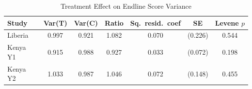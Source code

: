 \begin{table}[htbp]
\centering\small
\caption{Treatment Effect on Endline Score Variance}
\label{tab:variance}
\begin{tabular}{lcccccc}
\toprule
Study & Var(T) & Var(C) & Ratio & Sq.\ resid.\ coef & SE & Levene $p$ \\
\midrule
Liberia & 0.997 & 0.921 & 1.082 & 0.070 & (0.226) & 0.544 \\
Kenya Y1 & 0.915 & 0.988 & 0.927 & 0.033 & (0.072) & 0.198 \\
Kenya Y2 & 1.033 & 0.987 & 1.046 & 0.072 & (0.148) & 0.455 \\
\bottomrule
\end{tabular}
\par\smallskip{}
\end{table}